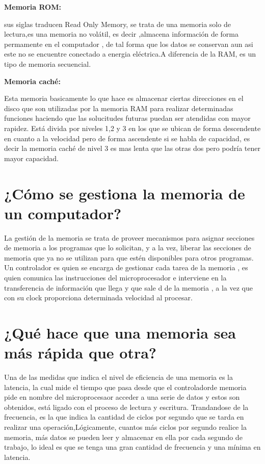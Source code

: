 \documentclass{article}
\begin{document}
\textbf{Memoria ROM:}

sus siglas traducen Read Only Memory, se trata de una memoria solo de lectura,es una memoria no volátil, es decir ,almacena información de forma permamente en el
computador , de tal forma que los datos se conservan aun asi este no se encuentre conectado a energia eléctrica.A diferencia de la RAM, es un tipo de memoria secuencial.  

\textbf{Memoria caché:}

Esta memoria basicamente lo que hace es almacenar ciertas direcciones en el disco que son utilizadas por la memoria RAM para realizar determinadas funciones haciendo que las solucitudes futuras puedan ser atendidas con mayor rapidez. Está divida por niveles 1,2 y 3 en los que se ubican de forma descendente en cuanto a la velocidad pero de forma ascendente si se habla de capacidad, es decir la memoria caché de nivel 3 es mas lenta que las otras dos pero podría tener mayor capacidad.

\section{¿Cómo se gestiona la memoria de un computador?} \label{contenido}
La gestión de la memoria se trata de proveer mecanismos para asignar secciones de memoria a los programas que lo solicitan,  y a la vez, liberar las secciones de memoria
que ya no se utilizan para que estén disponibles para otros programas. Un controlador es quien se encarga de gestionar cada tarea de la memoria , es quien comunica las instrucciones del microprocesador e interviene en la transferencia de información que llega y que sale d
de la memoria , a la vez que con su clock proporciona determinada velocidad al procesar.

\section{¿Qué hace que una memoria sea más rápida que otra?} \label{contenido}


Una de las medidas que indica el nivel de eficiencia de una memoria es la latencia, la cual mide el tiempo que pasa desde que el controladorde memoria pide en nombre del microprocesaor acceder a una serie de datos y estos son obtenidos, está ligado con el proceso de lectura y escritura.
Trandandose de la frecuencia, es la que  indica la cantidad de ciclos por segundo que se tarda en realizar una operación,Lógicamente, cuantos más ciclos por segundo realice la memoria, más datos se pueden leer y almacenar
en ella por cada segundo de trabajo, lo ideal es  que se tenga una gran cantidad de frecuencia y una mínima en latencia.
\end{document}
